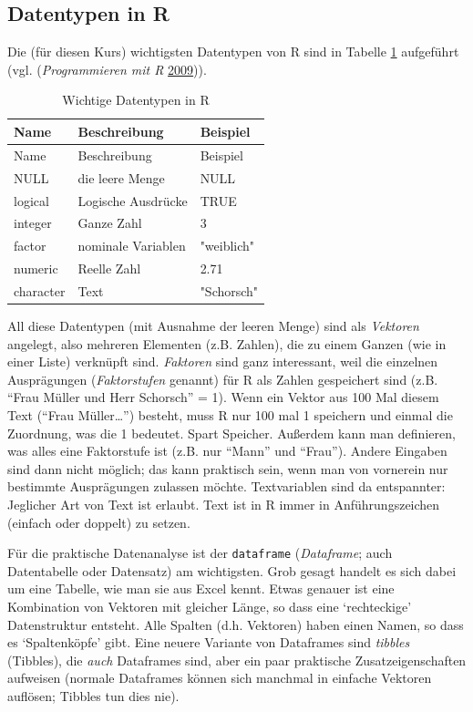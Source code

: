 \documentclass[12pt,ngerman,]{book}
\theoremstyle{definition}
\theoremstyle{definition}
\theoremstyle{remark}
\begin{document}
\subsection{Datentypen in R}\label{datentypen-in-r}

Die (für diesen Kurs) wichtigsten Datentypen von R sind in Tabelle
\ref{tab:datentypen} aufgeführt (vgl. (\emph{Programmieren mit R}
\protect\hyperlink{ref-ligges}{2009})).

\begin{table}

\caption{\label{tab:datentypen}Wichtige Datentypen in R}
\centering
\begin{tabular}[t]{l|l|l}
\hline
Name & Beschreibung & Beispiel\\
\hline
Name & Beschreibung & Beispiel\\
\hline
NULL & die leere Menge & NULL\\
\hline
logical & Logische Ausdrücke & TRUE\\
\hline
integer & Ganze Zahl & 3\\
\hline
factor & nominale Variablen & "weiblich"\\
\hline
numeric & Reelle Zahl & 2.71\\
\hline
character & Text & "Schorsch"\\
\hline
\end{tabular}
\end{table}

All diese Datentypen (mit Ausnahme der leeren Menge) sind als
\emph{Vektoren} angelegt, also mehreren Elementen (z.B.
Zahlen), die zu einem Ganzen (wie in einer Liste) verknüpft sind.
\emph{Faktoren} sind ganz interessant, weil die einzelnen Ausprägungen
(\emph{Faktorstufen} genannt) für R als Zahlen
gespeichert sind (z.B. ``Frau Müller und Herr Schorsch'' = 1). Wenn ein
Vektor aus 100 Mal diesem Text (``Frau Müller\ldots{}'') besteht, muss R
nur 100 mal 1 speichern und einmal die Zuordnung, was die 1 bedeutet.
Spart Speicher. Außerdem kann man definieren, was alles eine Faktorstufe
ist (z.B. nur ``Mann'' und ``Frau''). Andere Eingaben sind dann nicht
möglich; das kann praktisch sein, wenn man von vornerein nur bestimmte
Ausprägungen zulassen möchte. Textvariablen sind da entspannter:
Jeglicher Art von Text ist erlaubt. Text ist in R immer in
Anführungszeichen (einfach oder doppelt) zu setzen.

Für die praktische Datenanalyse ist der \texttt{dataframe}
(\emph{Dataframe}; auch Datentabelle
oder Datensatz) am wichtigsten. Grob gesagt handelt es
sich dabei um eine Tabelle, wie man sie aus Excel kennt. Etwas genauer
ist eine Kombination von Vektoren mit gleicher Länge, so dass eine
`rechteckige' Datenstruktur entsteht. Alle Spalten (d.h. Vektoren) haben
einen Namen, so dass es `Spaltenköpfe' gibt. Eine neuere Variante von
Dataframes sind \emph{tibbles} (Tibbles), die \emph{auch}
Dataframes sind, aber ein paar praktische Zusatzeigenschaften aufweisen
(normale Dataframes können sich manchmal in einfache Vektoren auflösen;
Tibbles tun dies nie).
\end{document}
